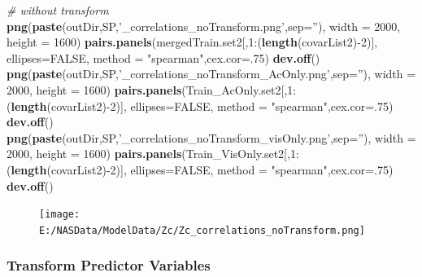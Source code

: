 \documentclass[11pt,]{article}
\newenvironment{Shaded}{\begin{snugshade}}{\end{snugshade}}
\newcommand{\KeywordTok}[1]{\textcolor[rgb]{0.13,0.29,0.53}{\textbf{{#1}}}}
\newcommand{\DataTypeTok}[1]{\textcolor[rgb]{0.13,0.29,0.53}{{#1}}}
\newcommand{\DecValTok}[1]{\textcolor[rgb]{0.00,0.00,0.81}{{#1}}}
\newcommand{\StringTok}[1]{\textcolor[rgb]{0.31,0.60,0.02}{{#1}}}
\newcommand{\CommentTok}[1]{\textcolor[rgb]{0.56,0.35,0.01}{\textit{{#1}}}}
\newcommand{\OtherTok}[1]{\textcolor[rgb]{0.56,0.35,0.01}{{#1}}}
\newcommand{\NormalTok}[1]{{#1}}
\begin{document}
\begin{Shaded}
\begin{Highlighting}[]
\CommentTok{# without transform}
\KeywordTok{png}\NormalTok{(}\KeywordTok{paste}\NormalTok{(outDir,SP,}\StringTok{'_correlations_noTransform.png'}\NormalTok{,}\DataTypeTok{sep=}\StringTok{''}\NormalTok{), }\DataTypeTok{width =} \DecValTok{2000}\NormalTok{, }\DataTypeTok{height =} \DecValTok{1600}\NormalTok{)}
\KeywordTok{pairs.panels}\NormalTok{(mergedTrain.set2[,}\DecValTok{1}\NormalTok{:(}\KeywordTok{length}\NormalTok{(covarList2)-}\DecValTok{2}\NormalTok{)], }\DataTypeTok{ellipses=}\OtherTok{FALSE}\NormalTok{, }\DataTypeTok{method =} \StringTok{"spearman"}\NormalTok{,}\DataTypeTok{cex.cor=}\NormalTok{.}\DecValTok{75}\NormalTok{)}
\KeywordTok{dev.off}\NormalTok{()}
\KeywordTok{png}\NormalTok{(}\KeywordTok{paste}\NormalTok{(outDir,SP,}\StringTok{'_correlations_noTransform_AcOnly.png'}\NormalTok{,}\DataTypeTok{sep=}\StringTok{''}\NormalTok{), }\DataTypeTok{width =} \DecValTok{2000}\NormalTok{, }\DataTypeTok{height =} \DecValTok{1600}\NormalTok{)}
\KeywordTok{pairs.panels}\NormalTok{(Train_AcOnly.set2[,}\DecValTok{1}\NormalTok{:(}\KeywordTok{length}\NormalTok{(covarList2)-}\DecValTok{2}\NormalTok{)], }\DataTypeTok{ellipses=}\OtherTok{FALSE}\NormalTok{, }\DataTypeTok{method =} \StringTok{"spearman"}\NormalTok{,}\DataTypeTok{cex.cor=}\NormalTok{.}\DecValTok{75}\NormalTok{)}
\KeywordTok{dev.off}\NormalTok{()}
\KeywordTok{png}\NormalTok{(}\KeywordTok{paste}\NormalTok{(outDir,SP,}\StringTok{'_correlations_noTransform_visOnly.png'}\NormalTok{,}\DataTypeTok{sep=}\StringTok{''}\NormalTok{), }\DataTypeTok{width =} \DecValTok{2000}\NormalTok{, }\DataTypeTok{height =} \DecValTok{1600}\NormalTok{)}
\KeywordTok{pairs.panels}\NormalTok{(Train_VisOnly.set2[,}\DecValTok{1}\NormalTok{:(}\KeywordTok{length}\NormalTok{(covarList2)-}\DecValTok{2}\NormalTok{)], }\DataTypeTok{ellipses=}\OtherTok{FALSE}\NormalTok{, }\DataTypeTok{method =} \StringTok{"spearman"}\NormalTok{,}\DataTypeTok{cex.cor=}\NormalTok{.}\DecValTok{75}\NormalTok{)}
\KeywordTok{dev.off}\NormalTok{()}
\end{Highlighting}
\end{Shaded}

\begin{figure}[htbp]
\centering
\texttt{[image: E:/NASData/ModelData/Zc/Zc\_correlations\_noTransform.png]}
\caption{}
\end{figure}

\subsubsection{Transform Predictor
Variables}\label{transform-predictor-variables}
\end{document}
